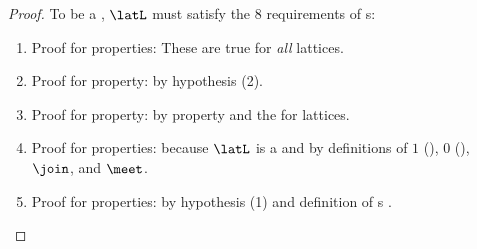 \begin{proof}
To be a , $\latL$ must satisfy the 8 requirements of s:
\begin{enumerate}
  \item Proof for  properties: These are true for \emph{all} lattices.
  \item Proof for  property: by hypothesis (2).
  \item Proof for  property: by  property and 
        the  for lattices.
  \item Proof for  properties: because $\latL$ is a 
        and by definitions of $1$ (), $0$ (), $\join$, and $\meet$.
  \item Proof for  properties: by hypothesis (1) and definition of s .
\end{enumerate}
\end{proof}

